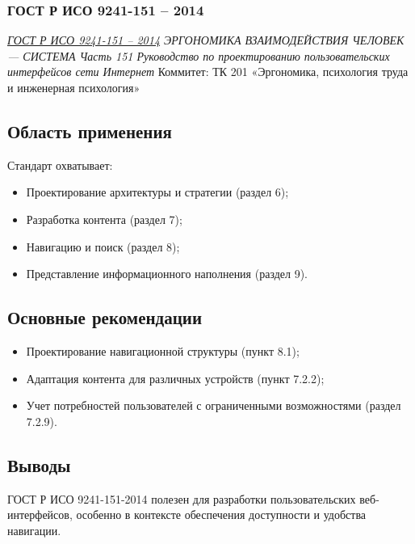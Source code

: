 \subsubsection{ГОСТ Р ИСО 9241-151 -- 2014}

\emph{\href{https://meganorm.ru/Data2/1/4293768/4293768927.pdf}{ГОСТ Р ИСО 9241-151 -- 2014}
ЭРГОНОМИКА ВЗАИМОДЕЙСТВИЯ
ЧЕЛОВЕК — СИСТЕМА Часть 151
Руководство по проектированию пользовательских
интерфейсов сети Интернет
}
Коммитет:  ТК 201 «Эргономика, психология труда и инженерная психология»
\subsection*{Область применения}
Стандарт охватывает:
\begin{itemize}
    \item Проектирование архитектуры и стратегии (раздел 6);
    \item Разработка контента (раздел 7);
    \item Навигацию и поиск (раздел 8);
    \item Представление информационного наполнения (раздел 9).
\end{itemize}

\subsection*{Основные рекомендации}
\begin{itemize}
    \item Проектирование навигационной структуры (пункт 8.1);
    \item Адаптация контента для различных устройств (пункт 7.2.2);
    \item Учет потребностей пользователей с ограниченными возможностями (раздел 7.2.9).
\end{itemize}

\subsection*{Выводы}
ГОСТ Р ИСО 9241-151-2014 полезен для разработки пользовательских веб-интерфейсов, особенно в контексте обеспечения доступности и удобства навигации.
